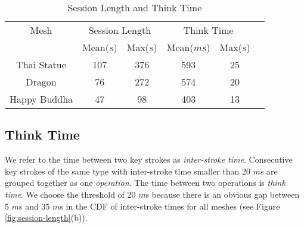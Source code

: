 
\begin{table}[hbp!]
\begin{center}
\begin{tabular}{|c|c|c|c|c|c|}
\hline 
Mesh&\multicolumn{2}{c|}{Session Length}&\multicolumn{2}{c|}{Think Time}\\
\cline{2-5}
&Mean($s$)&Max($s$)&Mean($ms$)&Max($s$)\\
\hline
Thai Statue&107&376&593&25\\
\hline
Dragon&76&272&574&20\\
\hline
Happy Buddha&47&98&403&13\\
\hline
\end{tabular}
\caption{Session Length and Think Time\label{t:TimeTable}}
\end{center}
\end{table}%

\subsection{Think Time}
We refer to the time between two key strokes as \textit{inter-stroke time}. 
Consecutive key strokes of the same type with inter-stroke time smaller than 20 $m$s
are grouped together as one \textit{operation}. 
The time between two operations is \textit{think time}. 
We choose the threshold of 20 $m$s because there is an obvious gap between 5 $m$s and 35 $m$s
in the CDF of inter-stroke times for all meshes (see Figure \ref{fig:session-length}(b)).

